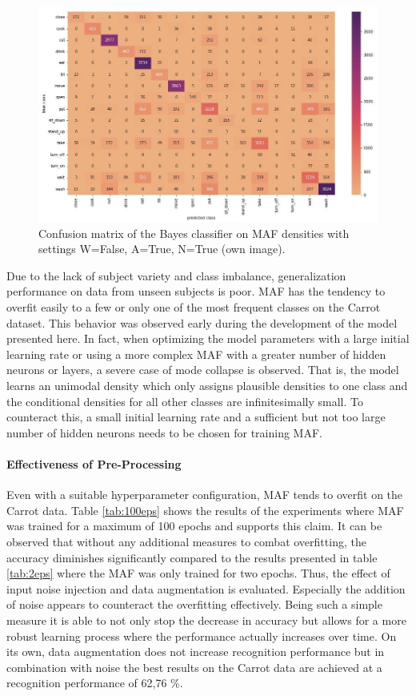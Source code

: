 \documentclass[11pt,titlepage,oneside,openany]{book}
\begin{document}
\begin{figure}[h]
	\centering
	\includegraphics[width=\linewidth]{conf_mat.jpg}
	\caption[Confusion matrix Carrot]{Confusion matrix of the Bayes classifier on MAF densities with settings W=False, A=True, N=True (own image).}
	\label{fig:conf}
\end{figure}

Due to the lack of subject variety and class imbalance, generalization performance on data from unseen subjects is poor. MAF has the tendency to overfit easily to a few or only one of the most frequent classes on the Carrot dataset. This behavior was observed early during the development of the model presented here. In fact, when optimizing the model parameters with a large initial learning rate or using a more complex MAF with a greater number of hidden neurons or layers, a severe case of mode collapse is observed. That is, the model learns an unimodal density which only assigns plausible densities to one class and the conditional densities for all other classes are infinitesimally small. To counteract this, a small initial learning rate and a sufficient but not too large number of hidden neurons needs to be chosen for training MAF.

\paragraph{Effectiveness of Pre-Processing}
Even with a suitable hyperparameter configuration, MAF tends to overfit on the Carrot data. Table \ref{tab:100eps} shows the results of the experiments where MAF was trained for a maximum of 100 epochs and supports this claim. It can be observed that without any additional measures to combat overfitting, the accuracy diminishes significantly compared to the results presented in table \ref{tab:2eps} where the MAF was only trained for two epochs. Thus, the effect of input noise injection and data augmentation is evaluated. Especially the addition of noise appears to counteract the overfitting effectively. Being such a simple measure it is able to not only stop the decrease in accuracy but allows for a more robust learning process where the performance actually increases over time. On its own, data augmentation does not increase recognition performance but in combination with noise the best results on the Carrot data are achieved at a recognition performance of 62,76 \%.
\end{document}
